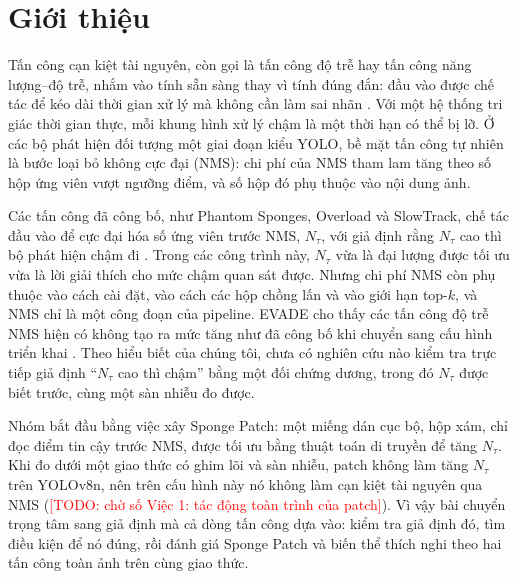 \documentclass[a4paper,fleqn]{cas-dc}
\newcommand{\todo}[1]{\textcolor{red}{[TODO: #1]}}
\newcommand{\Ntau}{N_{\tau}}
\begin{document}
\section{Giới thiệu}
Tấn công cạn kiệt tài nguyên, còn gọi là tấn công độ trễ hay tấn công năng lượng--độ trễ, nhắm vào tính sẵn sàng thay vì tính đúng đắn: đầu vào được chế tác để kéo dài thời gian xử lý mà không cần làm sai nhãn \cite{shumailov2021sponge,nicgslowdown2022}. Với một hệ thống tri giác thời gian thực, mỗi khung hình xử lý chậm là một thời hạn có thể bị lỡ. Ở các bộ phát hiện đối tượng một giai đoạn kiểu YOLO, bề mặt tấn công tự nhiên là bước loại bỏ không cực đại (NMS): chi phí của NMS tham lam tăng theo số hộp ứng viên vượt ngưỡng điểm, và số hộp đó phụ thuộc vào nội dung ảnh.

Các tấn công đã công bố, như Phantom Sponges, Overload và SlowTrack, chế tác đầu vào để cực đại hóa số ứng viên trước NMS, $\Ntau$, với giả định rằng $\Ntau$ cao thì bộ phát hiện chậm đi \cite{phantom2023,overload2024,slowtrack2024}. Trong các công trình này, $\Ntau$ vừa là đại lượng được tối ưu vừa là lời giải thích cho mức chậm quan sát được. Nhưng chi phí NMS còn phụ thuộc vào cách cài đặt, vào cách các hộp chồng lấn và vào giới hạn top-$k$, và NMS chỉ là một công đoạn của pipeline. EVADE cho thấy các tấn công độ trễ NMS hiện có không tạo ra mức tăng như đã công bố khi chuyển sang cấu hình triển khai \cite{evade2025}. Theo hiểu biết của chúng tôi, chưa có nghiên cứu nào kiểm tra trực tiếp giả định ``$\Ntau$ cao thì chậm'' bằng một đối chứng dương, trong đó $\Ntau$ được biết trước, cùng một sàn nhiễu đo được.

Nhóm bắt đầu bằng việc xây Sponge Patch: một miếng dán cục bộ, hộp xám, chỉ đọc điểm tin cậy trước NMS, được tối ưu bằng thuật toán di truyền để tăng $\Ntau$. Khi đo dưới một giao thức có ghim lõi và sàn nhiễu, patch không làm tăng $\Ntau$ trên YOLOv8n, nên trên cấu hình này nó không làm cạn kiệt tài nguyên qua NMS (\todo{chờ số Việc 1: tác động toàn trình của patch}). Vì vậy bài chuyển trọng tâm sang giả định mà cả dòng tấn công dựa vào: kiểm tra giả định đó, tìm điều kiện để nó đúng, rồi đánh giá Sponge Patch và biến thể thích nghi theo hai tấn công toàn ảnh trên cùng giao thức.
\end{document}

